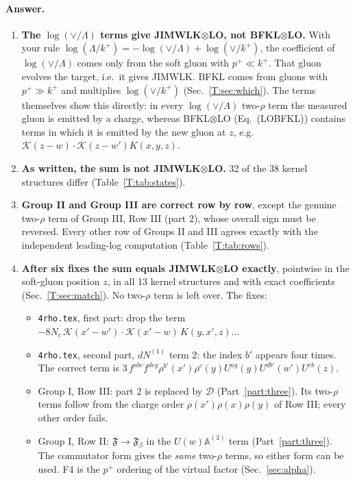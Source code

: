 \documentclass[10pt]{article}
\numberwithin{equation}{section}
\newcommand{\KK}{\mathcal K}
\begin{document}
\paragraph{Answer.}
\begin{enumerate}
\item \textbf{The $\log(\vee/\Lambda)$ terms give JIMWLK$\otimes$LO, not BFKL$\otimes$LO.} With your rule $\log(\Lambda/k^+)=-\log(\vee/\Lambda)+\log(\vee/k^+)$, the coefficient of $\log(\vee/\Lambda)$ comes only from the soft gluon with $p^+\ll k^+$. That gluon evolves the target, i.e.\ it gives JIMWLK. BFKL comes from gluons with $p^+\gg k^+$ and multiplies $\log(\vee/k^+)$ (Sec.~\ref{T:sec:which}). The terms themselves show this directly: in every $\log(\vee/\Lambda)$ two-$\rho$ term the measured gluon is emitted by a charge, whereas BFKL$\otimes$LO (Eq.~(LOBFKL)) contains terms in which it is emitted by the new gluon at $z$, e.g.\ $\KK(z-w)\cdot\KK(z-w')K(x,y,z)$.
\item \textbf{As written, the sum is not JIMWLK$\otimes$LO.} 32 of the 38 kernel structures differ (Table~\ref{T:tab:states}).
\item \textbf{Group II and Group III are correct row by row}, except the genuine two-$\rho$ term of Group III, Row III (part 2), whose overall sign must be reversed. Every other row of Groups II and III agrees exactly with the independent leading-log computation (Table~\ref{T:tab:rows}).
\item \textbf{After six fixes the sum equals JIMWLK$\otimes$LO exactly}, pointwise in the soft-gluon position $z$, in all 13 kernel structures and with exact coefficients (Sec.~\ref{T:sec:match}). No two-$\rho$ term is left over. The fixes:
\begin{itemize}
\item[F1] \texttt{4rho.tex}, first part: drop the term $-8N_c\,\KK(x'-w')\cdot\KK(x'-w)\,K(y,x',z)\dots$
\item[F2] \texttt{4rho.tex}, second part, $dN^{(1)}$ term 2: the index $b'$ appears four times. The correct term is $3\,f^{abc}f^{deg}\rho^{b'}(x')\rho^c(y)U^{ag}(y)U^{db'}(w')U^{eb}(z)$.
\item[F3] Group I, Row III: part 2 is replaced by $\mathcal D$ (Part~\ref{part:three}). Its two-$\rho$ terms follow from the charge order $\rho(x')\rho(x)\rho(y)$ of Row III; every other order fails.
\item[F4] Group I, Row II: $\mathfrak F\to\mathfrak F_\beta$ in the $U(w)\mathbb A^{(3)}$ term (Part~\ref{part:three}). The commutator form gives the \emph{same} two-$\rho$ terms, so either form can be used. F4 is the $p^+$ ordering of the virtual factor (Sec.~\ref{sec:alpha}).

\end{itemize}
\end{enumerate}
\end{document}
